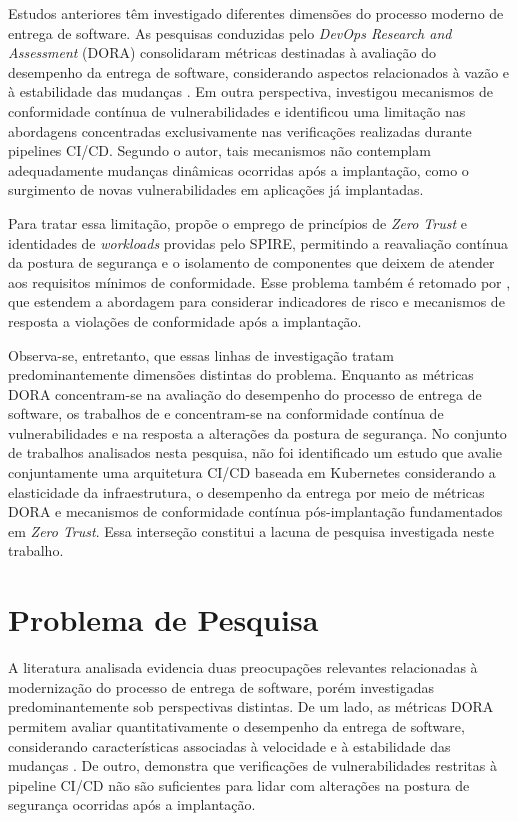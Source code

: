 Estudos anteriores têm investigado diferentes dimensões do processo moderno de
entrega de software. As pesquisas conduzidas pelo \textit{DevOps Research and Assessment}
(DORA) consolidaram métricas destinadas à avaliação do desempenho da entrega de software,
considerando aspectos relacionados à vazão e à estabilidade das mudanças
\cite{dora2024}. Em outra perspectiva,  investigou mecanismos de
conformidade contínua de vulnerabilidades e identificou uma limitação nas abordagens
concentradas exclusivamente nas verificações realizadas durante pipelines CI/CD. Segundo
o autor, tais mecanismos não contemplam adequadamente mudanças dinâmicas ocorridas após
a implantação, como o surgimento de novas vulnerabilidades em aplicações já implantadas.

Para tratar essa limitação,  propõe o emprego de princípios de
\textit{Zero Trust} e identidades de \textit{workloads} providas pelo SPIRE, permitindo
a reavaliação contínua da postura de segurança e o isolamento de componentes que deixem
de atender aos requisitos mínimos de conformidade. Esse problema também é retomado por
, que estendem a abordagem para considerar indicadores de risco e
mecanismos de resposta a violações de conformidade após a implantação.

Observa-se, entretanto, que essas linhas de investigação tratam predominantemente
dimensões distintas do problema. Enquanto as métricas DORA concentram-se na avaliação
do desempenho do processo de entrega de software, os trabalhos de
 e  concentram-se na conformidade contínua
de vulnerabilidades e na resposta a alterações da postura de segurança. No conjunto de
trabalhos analisados nesta pesquisa, não foi identificado um estudo que avalie conjuntamente
uma arquitetura CI/CD baseada em Kubernetes considerando a elasticidade da infraestrutura,
o desempenho da entrega por meio de métricas DORA e mecanismos de conformidade contínua
pós-implantação fundamentados em \textit{Zero Trust}. Essa interseção constitui a lacuna
de pesquisa investigada neste trabalho.

\section{Problema de Pesquisa}
\label{sec:problema-pesquisa}

A literatura analisada evidencia duas preocupações relevantes relacionadas à
modernização do processo de entrega de software, porém investigadas predominantemente
sob perspectivas distintas. De um lado, as métricas DORA permitem avaliar quantitativamente
o desempenho da entrega de software, considerando características associadas à velocidade
e à estabilidade das mudanças \cite{dora2024}. De outro,  demonstra
que verificações de vulnerabilidades restritas à pipeline CI/CD não são suficientes para
lidar com alterações na postura de segurança ocorridas após a implantação.

